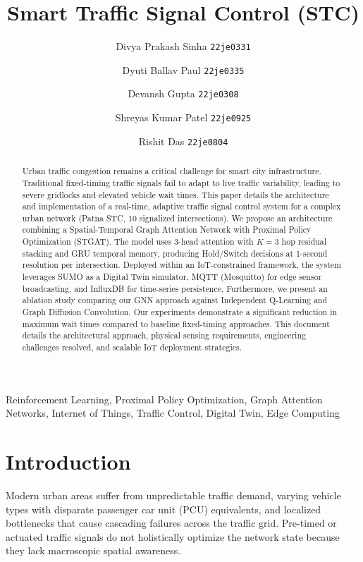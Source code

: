 \documentclass[12pt, onecolumn]{IEEEtran}
\begin{document}
\title{Smart Traffic Signal Control (STC)}

\author[1]{\small Divya Prakash Sinha \texttt{22je0331}}
\author[1]{\small Dyuti Ballav Paul \texttt{22je0335}}
\author[1]{\small Devansh Gupta \texttt{22je0308}}
\author[1]{\small Shreyas Kumar Patel \texttt{22je0925}}
\author[1]{\small Rishit Das \texttt{22je0804}}

\maketitle

\begin{abstract}
Urban traffic congestion remains a critical challenge for smart city infrastructure. Traditional fixed-timing traffic signals fail to adapt to live traffic variability, leading to severe gridlocks and elevated vehicle wait times. This paper details the architecture and implementation of a real-time, adaptive traffic signal control system for a complex urban network (Patna STC, 10 signalized intersections). We propose an architecture combining a Spatial-Temporal Graph Attention Network with Proximal Policy Optimization (STGAT). The model uses 3-head attention with $K{=}3$ hop residual stacking and GRU temporal memory, producing Hold/Switch decisions at 1-second resolution per intersection. Deployed within an IoT-constrained framework, the system leverages SUMO as a Digital Twin simulator, MQTT (Mosquitto) for edge sensor broadcasting, and InfluxDB for time-series persistence. Furthermore, we present an ablation study comparing our GNN approach against Independent Q-Learning and Graph Diffusion Convolution. Our experiments demonstrate a significant reduction in maximum wait times compared to baseline fixed-timing approaches. This document details the architectural approach, physical sensing requirements, engineering challenges resolved, and scalable IoT deployment strategies.
\end{abstract}

\begin{IEEEkeywords}
Reinforcement Learning, Proximal Policy Optimization, Graph Attention Networks, Internet of Things, Traffic Control, Digital Twin, Edge Computing
\end{IEEEkeywords}

\section{Introduction}
Modern urban areas suffer from unpredictable traffic demand, varying vehicle types with disparate passenger car unit (PCU) equivalents, and localized bottlenecks that cause cascading failures across the traffic grid. Pre-timed or actuated traffic signals do not holistically optimize the network state because they lack macroscopic spatial awareness.
\end{document}
